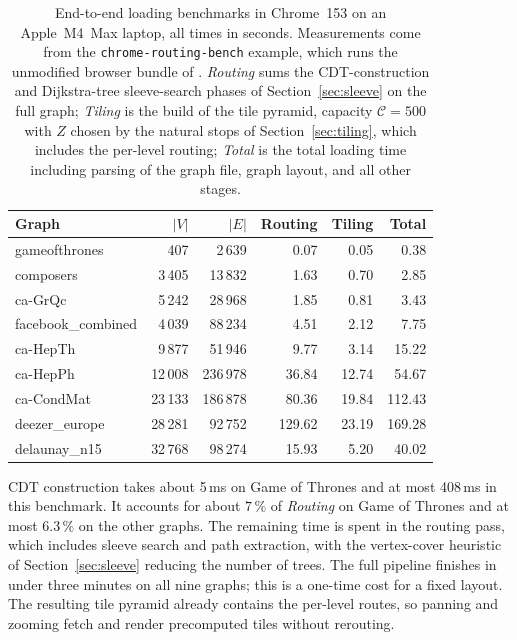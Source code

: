 \documentclass[review]{vgtc}          %
\newcommand{\msagljs}{\textsf{\libname}}
\begin{document}
\begin{table}[t]
  \caption{End-to-end loading benchmarks in Chrome~153 on an
    Apple~M4~Max laptop, all times in seconds. Measurements come from
    the \texttt{chrome-routing-bench} example, which runs the
    unmodified browser bundle of \msagljs{}. \emph{Routing} sums the
    CDT-construction and Dijkstra-tree sleeve-search phases of
    Section~\ref{sec:sleeve} on the full graph; \emph{Tiling} is the
    build of the tile pyramid, capacity $\mathcal{C}=500$ with $Z$
    chosen by the natural stops of Section~\ref{sec:tiling}, which
    includes the per-level routing; \emph{Total} is the total
    loading time including parsing of the graph file, graph layout,
    and all other stages.}
  \label{tab:perf}
  \centering
  \scriptsize
  \setlength{\tabcolsep}{6pt}
  \begin{tabular}{@{}lrrrrr@{}}
    \toprule
    Graph & $|V|$ & $|E|$ & Routing & Tiling & Total \\
    \midrule
    gameofthrones      &     407 &   2\,639 &   0.07 &   0.05 &   0.38 \\
    composers          &  3\,405 &  13\,832 &   1.63 &   0.70 &   2.85 \\
    ca-GrQc            &  5\,242 &  28\,968 &   1.85 &   0.81 &   3.43 \\
    facebook\_combined &  4\,039 &  88\,234 &   4.51 &   2.12 &   7.75 \\
    ca-HepTh           &  9\,877 &  51\,946 &   9.77 &   3.14 &  15.22 \\
    ca-HepPh           & 12\,008 & 236\,978 &  36.84 &  12.74 &  54.67 \\
    ca-CondMat         & 23\,133 & 186\,878 &  80.36 &  19.84 & 112.43 \\
    deezer\_europe     & 28\,281 &  92\,752 & 129.62 &  23.19 & 169.28 \\
    delaunay\_n15      & 32\,768 &  98\,274 &  15.93 &   5.20 &  40.02 \\
    \bottomrule
  \end{tabular}
\end{table}

CDT construction takes about 5\,ms on Game of Thrones and at most
408\,ms in this benchmark. It accounts for about $7\,\%$ of
\emph{Routing} on Game of Thrones and at most $6.3\,\%$ on the other
graphs. The remaining time is spent in the routing pass, which
includes sleeve search and path extraction, with the vertex-cover
heuristic of Section~\ref{sec:sleeve} reducing the number of trees.
The full pipeline finishes in under three minutes on all nine
graphs; this is a one-time cost for a fixed layout. The resulting
tile pyramid already contains the per-level routes, so panning and
zooming fetch and render precomputed tiles without rerouting.
\end{document}
